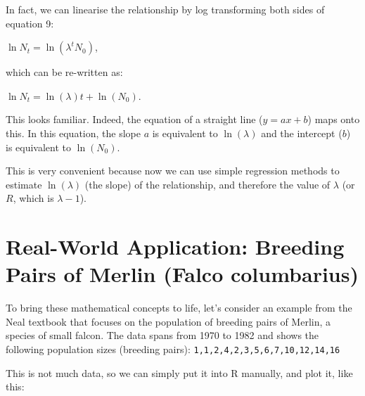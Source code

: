 \documentclass[
  a4paper]{book}
\newenvironment{Shaded}{\begin{snugshade}}{\end{snugshade}}
\newcommand{\AttributeTok}[1]{\textcolor[rgb]{0.13,0.29,0.53}{#1}}
\newcommand{\DecValTok}[1]{\textcolor[rgb]{0.00,0.00,0.81}{#1}}
\newcommand{\FunctionTok}[1]{\textcolor[rgb]{0.13,0.29,0.53}{\textbf{#1}}}
\newcommand{\NormalTok}[1]{#1}
\newcommand{\OtherTok}[1]{\textcolor[rgb]{0.56,0.35,0.01}{#1}}
\newcommand{\SpecialCharTok}[1]{\textcolor[rgb]{0.81,0.36,0.00}{\textbf{#1}}}
\newcommand{\StringTok}[1]{\textcolor[rgb]{0.31,0.60,0.02}{#1}}
\begin{document}
In fact, we can linearise the relationship by log transforming both sides of equation 9:

\(\ln{N_t} = \ln(\lambda ^tN_0)\),

which can be re-written as:

\(\ln{N_t} =  \ln(\lambda )t + \ln(N_0)\).

This looks familiar. Indeed, the equation of a straight line (\(y = ax + b\)) maps onto this. In this equation, the slope \(a\) is equivalent to \(\ln(\lambda )\) and the intercept (\(b\)) is equivalent to \(\ln(N_0)\).

This is very convenient because now we can use simple regression methods to estimate \(\ln(\lambda)\) (the slope) of the relationship, and therefore the value of \(\lambda\) (or \(R\), which is \(\lambda -1\)).

\section{Real-World Application: Breeding Pairs of Merlin (Falco columbarius)}\label{real-world-application-breeding-pairs-of-merlin-falco-columbarius}

To bring these mathematical concepts to life, let's consider an example from the Neal textbook that focuses on the population of breeding pairs of Merlin, a species of small falcon. The data spans from 1970 to 1982 and shows the following population sizes (breeding pairs): \texttt{1,1,2,4,2,3,5,6,7,10,12,14,16}

This is not much data, so we can simply put it into R manually, and plot it, like this:

\begin{Shaded}
\end{Shaded}
\end{document}

